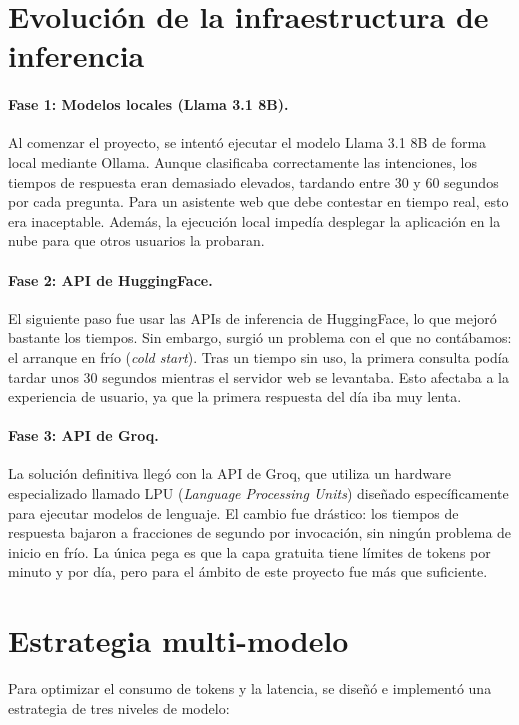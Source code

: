 \documentclass[12pt,a4paper,oneside]{report}
\begin{document}
\section{Evolución de la infraestructura de inferencia}
\paragraph{Fase 1: Modelos locales (Llama 3.1 8B).} Al comenzar el proyecto, se intentó ejecutar el modelo Llama 3.1 8B de forma local mediante Ollama. Aunque clasificaba correctamente las intenciones, los tiempos de respuesta eran demasiado elevados, tardando entre 30 y 60 segundos por cada pregunta. Para un asistente web que debe contestar en tiempo real, esto era inaceptable. Además, la ejecución local impedía desplegar la aplicación en la nube para que otros usuarios la probaran.

\paragraph{Fase 2: API de HuggingFace.} El siguiente paso fue usar las APIs de inferencia de HuggingFace, lo que mejoró bastante los tiempos. Sin embargo, surgió un problema con el que no contábamos: el arranque en frío (\textit{cold start}). Tras un tiempo sin uso, la primera consulta podía tardar unos 30 segundos mientras el servidor web se levantaba. Esto afectaba a la experiencia de usuario, ya que la primera respuesta del día iba muy lenta.

\paragraph{Fase 3: API de Groq.} La solución definitiva llegó con la API de Groq, que utiliza un hardware especializado llamado LPU (\textit{Language Processing Units}) diseñado específicamente para ejecutar modelos de lenguaje. El cambio fue drástico: los tiempos de respuesta bajaron a fracciones de segundo por invocación, sin ningún problema de inicio en frío. La única pega es que la capa gratuita tiene límites de tokens por minuto y por día, pero para el ámbito de este proyecto fue más que suficiente.


\section{Estrategia multi-modelo}

Para optimizar el consumo de tokens y la latencia, se diseñó e implementó una estrategia de tres niveles de modelo:
\end{document}
